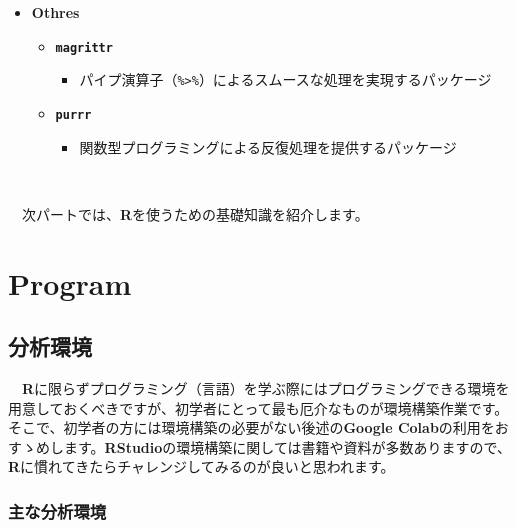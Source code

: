 \documentclass[
  12pt,
]{book}
\providecommand{\tightlist}{%
  \setlength{\itemsep}{0pt}\setlength{\parskip}{0pt}}
\begin{document}
\begin{itemize}
\tightlist
\item
  \textbf{Othres}

  \begin{itemize}
  \tightlist
  \item
    \textbf{\texttt{magrittr}} \citep{R-magrittr} 

    \begin{itemize}
    \tightlist
    \item
      パイプ演算子（\texttt{\%\textgreater{}\%}）によるスムースな処理を実現するパッケージ
    \end{itemize}
  \item
    \textbf{\texttt{purrr}} \citep{R-purrr} 

    \begin{itemize}
    \tightlist
    \item
      関数型プログラミングによる反復処理を提供するパッケージ
    \end{itemize}
  \end{itemize}
\end{itemize}

　

　次パートでは、\textbf{R}を使うための基礎知識を紹介します。

\hypertarget{part-program}{%
\part{Program}\label{part-program}}

\hypertarget{ux5206ux6790ux74b0ux5883}{%
\chapter{分析環境}\label{ux5206ux6790ux74b0ux5883}}

　\textbf{R}に限らずプログラミング（言語）を学ぶ際にはプログラミングできる環境を用意しておくべきですが、初学者にとって最も厄介なものが環境構築作業です。そこで、初学者の方には環境構築の必要がない後述の\textbf{Google Colab}の利用をおすゝめします。\textbf{RStudio}の環境構築に関しては書籍や資料が多数ありますので、\textbf{R}に慣れてきたらチャレンジしてみるのが良いと思われます。

\hypertarget{ux4e3bux306aux5206ux6790ux74b0ux5883}{%
\section{主な分析環境}\label{ux4e3bux306aux5206ux6790ux74b0ux5883}}
\end{document}
